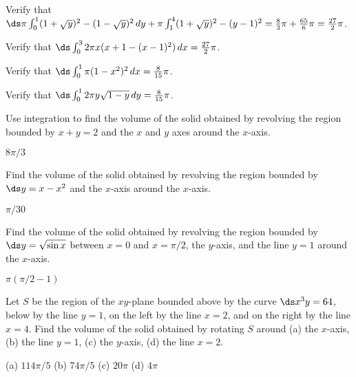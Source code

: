 \begin{exercises}

\begin{exercise}
Verify that $\ds\pi\int_0^1 (1+\sqrt{y})^2-(1-\sqrt{y})^2\,dy+
\pi\int_1^4  (1+\sqrt{y})^2-(y-1)^2={8\over3}\pi + {65\over6}\pi
={27\over2}\pi$.

\begin{exercise} Verify that $\ds\int_0^3 2\pi x(x+1-(x-1)^2)\,dx={27\over2}\pi$.

\begin{exercise} Verify that $\ds \int_0^1 \pi(1-x^2)^2\,dx={8\over15}\pi$.

\begin{exercise} Verify that $\ds \int_0^1 2\pi y \sqrt{1-y}\,dy={8\over15}\pi$.

\begin{exercise}
Use integration to find the volume of the solid obtained by revolving 
the region bounded by $x+y=2$ and the $x$ and $y$ axes around the
$x$-axis. 
\begin{answer} $8\pi/3$
\end{answer}\end{exercise}

\begin{exercise}
Find the volume of the solid obtained by revolving 
the region bounded by $\ds y=x-x^2$
and the $x$-axis around the
$x$-axis. 
\begin{answer} $\pi/30$
\end{answer}\end{exercise}

\begin{exercise}
Find the volume of the solid obtained by revolving 
the region bounded by $\ds y=\sqrt{\sin x}$ between $x=0$ and
$x=\pi/2$, the $y$-axis, and the line
$y=1$ around the
$x$-axis. 
\begin{answer} $\pi(\pi/2-1)$
\end{answer}\end{exercise}

\begin{exercise}
Let $S$ be the region of the $xy$-plane bounded above by the curve
$\ds x^3y=64$, below by the line $y=1$, on the left by  the line $x=2$, and
on the right by the line $x=4$.  Find
the volume of the solid obtained by rotating $S$ around (a) the $x$-axis,
(b) the line $y=1$, (c) the $y$-axis, (d) the line $x=2$.
\begin{answer} (a) $114\pi/5$ (b) $74\pi/5$ (c) $20\pi$\hfill\break
(d) $4\pi$
\end{answer}\end{exercise}


\end{exercise}
\end{exercise}
\end{exercise}
\end{exercise}
\end{exercises}
